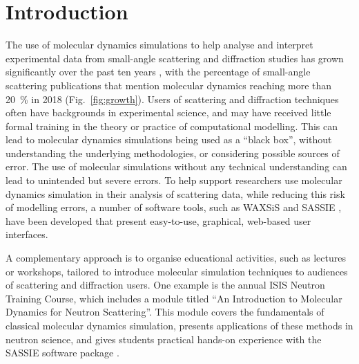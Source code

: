 \documentclass[amsmath,amssymb,twocolumn,superscriptaddress]{revtex4-1}
\begin{document}
\maketitle                        %

\section{Introduction}

\noindent The use of molecular dynamics simulations to help analyse and interpret experimental data from small-angle scattering and diffraction studies has grown significantly over the past ten years \cite{pan_molecular_2012,boldon_review_2015,hub_interpreting_2018,ivanovic_temperature-dependent_2018,east_structural_2016,wall_conformational_2014,wall_internal_2018,satoh_multiple_2015},
with the percentage of small-angle scattering publications that mention molecular dynamics reaching more than \SI{20}{\percent} in 2018 (Fig.~\ref{fig:growth}).
Users of scattering and diffraction techniques often have backgrounds in experimental science, and may have received little formal training in the theory or practice of computational modelling.
This can lead to molecular dynamics simulations being used as a ``black box'', without understanding the underlying methodologies, or considering possible sources of error.
The use of molecular simulations without any technical understanding can lead to unintended but severe errors.
To help support researchers use molecular dynamics simulation in their analysis of scattering data, while reducing this risk of modelling errors, a number of software tools, such as WAXSiS and SASSIE \cite{chen_validating_2014,knight_waxsis_2015,perkins_atomistic_2016}, have been developed that present easy-to-use, graphical, web-based user interfaces.

A complementary approach is to organise educational activities, such as lectures or workshops, tailored to introduce molecular simulation techniques to audiences of scattering and diffraction users.
One example is the annual ISIS Neutron Training Course, which includes a module titled ``An Introduction to Molecular Dynamics for Neutron Scattering''.
This module covers the fundamentals of classical molecular dynamics simulation, presents applications of these methods in neutron science, and gives students practical hands-on experience with the SASSIE software package \cite{perkins_atomistic_2016}.
\end{document}
